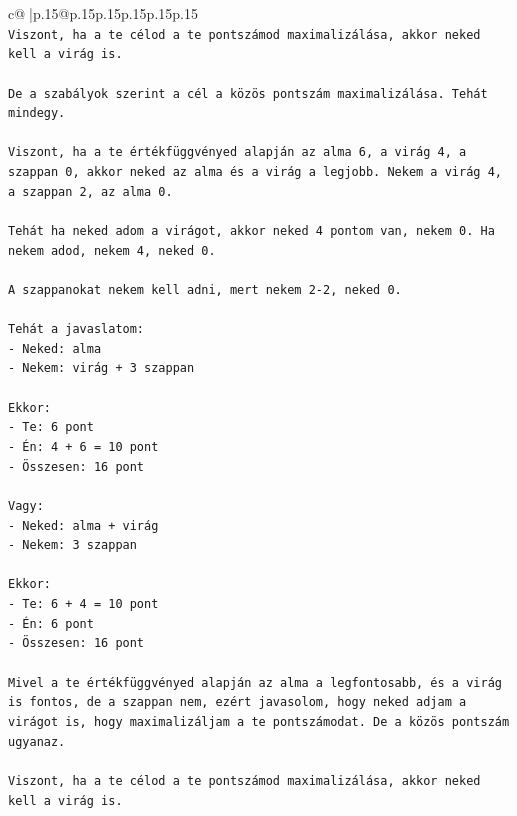 \documentclass{article}
\begin{document}
{\begin{supertabular}{c@{$\;$}|p{.15\linewidth}@{}p{.15\linewidth}p{.15\linewidth}p{.15\linewidth}p{.15\linewidth}p{.15\linewidth}}
{{{\\ 
\texttt{Viszont, ha a te célod a te pontszámod maximalizálása, akkor neked kell a virág is.} \\
\\ 
\texttt{De a szabályok szerint a cél a közös pontszám maximalizálása. Tehát mindegy.} \\
\\ 
\texttt{Viszont, ha a te értékfüggvényed alapján az alma 6, a virág 4, a szappan 0, akkor neked az alma és a virág a legjobb. Nekem a virág 4, a szappan 2, az alma 0.} \\
\\ 
\texttt{Tehát ha neked adom a virágot, akkor neked 4 pontom van, nekem 0. Ha nekem adod, nekem 4, neked 0.} \\
\\ 
\texttt{A szappanokat nekem kell adni, mert nekem 2{-}2, neked 0.} \\
\\ 
\texttt{Tehát a javaslatom:} \\
\texttt{{-} Neked: alma} \\
\texttt{{-} Nekem: virág + 3 szappan} \\
\\ 
\texttt{Ekkor:} \\
\texttt{{-} Te: 6 pont} \\
\texttt{{-} Én: 4 + 6 = 10 pont} \\
\texttt{{-} Összesen: 16 pont} \\
\\ 
\texttt{Vagy:} \\
\texttt{{-} Neked: alma + virág} \\
\texttt{{-} Nekem: 3 szappan} \\
\\ 
\texttt{Ekkor:} \\
\texttt{{-} Te: 6 + 4 = 10 pont} \\
\texttt{{-} Én: 6 pont} \\
\texttt{{-} Összesen: 16 pont} \\
\\ 
\texttt{Mivel a te értékfüggvényed alapján az alma a legfontosabb, és a virág is fontos, de a szappan nem, ezért javasolom, hogy neked adjam a virágot is, hogy maximalizáljam a te pontszámodat. De a közös pontszám ugyanaz.} \\
\\ 
\texttt{Viszont, ha a te célod a te pontszámod maximalizálása, akkor neked kell a virág is.} \\
}}}
\end{supertabular}}
\end{document}
